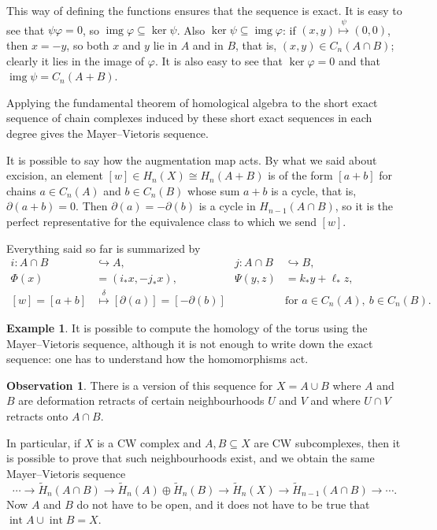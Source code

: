 \documentclass{book}
\theoremstyle{definition}
\newtheorem*{obs}{Observation}
\newtheorem*{ejem}{Example}
\DeclareMathOperator{\img}{img}
\DeclareMathOperator{\Int}{int}
\begin{document}
This way of defining the functions ensures that the sequence
is exact. It is easy to see that $\psi\varphi=0$, so
$\img\varphi\subseteq\ker\psi$. Also
$\ker\psi\subseteq\img\varphi$: if
$(x,y)\overset{\psi}{\mapsto}(0,0)$, then $x=-y$, so both
$x$ and $y$ lie in $A$ and in $B$, that is,
$(x,y)\in C_n(A\cap B)$; clearly it lies in the image of
$\varphi$. It is also easy to see that $\ker\varphi=0$ and
that $\img\psi=C_n(A+B)$.

Applying the fundamental theorem of homological algebra to
the short exact sequence of chain complexes induced by these
short exact sequences in each degree gives the Mayer--Vietoris
sequence.

It is possible to say how the augmentation map acts. By what
we said about excision, an element
$[w]\in H_n(X)\cong H_n(A+B)$ is of the form $[a+b]$ for
chains $a\in C_n(A)$ and $b\in C_n(B)$ whose sum $a+b$ is a
cycle, that is, $\partial(a+b)=0$. Then
$\partial(a)=-\partial(b)$ is a cycle in $H_{n-1}(A\cap B)$,
so it is the perfect representative for the equivalence class
to which we send $[w]$.

Everything said so far is summarized by
$$
\begin{aligned}
i:A\cap B&\hookrightarrow A,
&j:A\cap B&\hookrightarrow B,\\
\Phi(x)&=(i_*x,-j_*x),
&\Psi(y,z)&=k_*y+\ell_*z,\\
[w]=[a+b]&\overset{\delta}{\mapsto}[
\partial(a)]=[-\partial(b)]
& &\text{for }a\in C_n(A),\ b\in C_n(B).
\end{aligned}
$$

\begin{ejem}
It is possible to compute the homology of the torus using the
Mayer--Vietoris sequence, although it is not enough to write
down the exact sequence: one has to understand how the
homomorphisms act.
\end{ejem}

\begin{obs}
There is a version of this sequence for $X=A\cup B$ where
$A$ and $B$ are deformation retracts of certain
neighbourhoods $U$ and $V$ and where $U\cap V$ retracts onto
$A\cap B$.

In particular, if $X$ is a CW complex and $A,B\subseteq X$
are CW subcomplexes, then it is possible to prove that such
neighbourhoods exist, and we obtain the same Mayer--Vietoris
sequence
$$
\cdots\to\tilde H_n(A\cap B)\to
\tilde H_n(A)\oplus\tilde H_n(B)\to\tilde H_n(X)
\to\tilde H_{n-1}(A\cap B)\to\cdots.
$$
Now $A$ and $B$ do not have to be open, and it does not have
to be true that $\Int A\cup\Int B=X$.
\end{obs}
\end{document}
